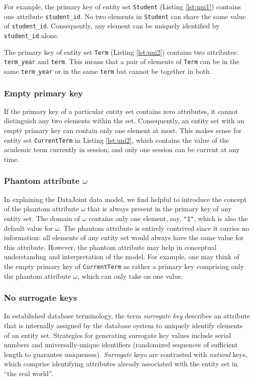 \documentclass[letter,10pt]{article}
\newcommand{\datajoint}{DataJoint\xspace}
\begin{document}
For example, the primary key of entity set \lstinline$Student$ (Listing \ref{lst:uni1}) contains one attribute \lstinline$student_id$.  
No two elements in \lstinline$Student$ can share the same value of \lstinline$student_id$. 
Consequently, any element can be uniquely identified by \lstinline$student_id$ alone. 

The primary key of entity set \lstinline$Term$ (Listing \ref{lst:uni2}) contains two attributes: \lstinline$term_year$ and \lstinline$term$.
This means that a pair of elements of \lstinline$Term$ can be in the same \lstinline$term_year$ or in the same \lstinline$term$ but cannot be together in both. 

\subsubsection{Empty primary key}
If the primary key of a particular entity set contains zero attributes, it cannot distinguish any two elements within the set.  
Consequently, an entity set with an empty primary key can contain only one element at most.
This makes sense for entity set \lstinline$CurrentTerm$ in Listing \ref{lst:uni2}, which contains the value of the academic term currently in session; and only one session can be current at any time.

\subsubsection{Phantom attribute $\omega$}\label{sec:phantom}
In explaining the \datajoint data model, we find helpful to introduce the concept of the phantom attribute $\omega$ that is always present in the primary key of any entity set.  
The domain of $\omega$ contains only one element, say, \lstinline$"1"$, which is also the default value for $\omega$.
The phantom attribute is entirely contrived since it carries no information: all elements of any entity set would always have the same value for this attribute.
However, the phantom attribute may help in conceptual understanding and interpretation of the model.
For example, one may think of the empty primary key of \lstinline$CurrentTerm$ as rather a primary key comprising only the phantom attribute $\omega$, which can only take on one value.
 
\subsubsection{No surrogate keys}
In established database terminology, the term \emph{surrogate key} describes an attribute that is internally assigned by the database system to uniquely identify elements of an entity set. 
Strategies for generating surrogate key values include serial numbers and universally-unique identifiers (randomized sequences of sufficient length to guarantee uniqueness).
\emph{Surrogate} keys are contrasted with \emph{natural} keys, which comprise identifying attributes already associated with the entity set in ``the real world''.
\end{document}
